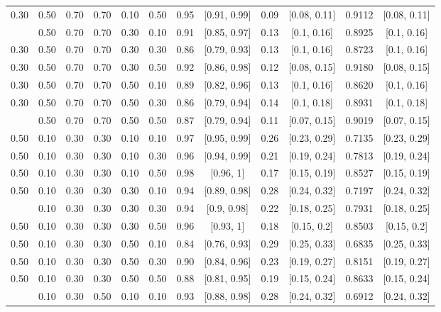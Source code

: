 \documentclass[
  11pt,
]{article}
\begin{document}
\begin{landscape}
\begin{ThreePartTable}
\begin{longtable}[t]{cccccccccccc}
0.30 & 0.50 & 0.70 & 0.70 & 0.10 & 0.50 & 0.95 & {}[0.91, 0.99] & 0.09 & {}[0.08, 0.11] & 0.9112 & {}[0.08, 0.11]\\
\addlinespace
0.30 & 0.50 & 0.70 & 0.70 & 0.30 & 0.10 & 0.91 & {}[0.85, 0.97] & 0.13 & {}[0.1, 0.16] & 0.8925 & {}[0.1, 0.16]\\
0.30 & 0.50 & 0.70 & 0.70 & 0.30 & 0.30 & 0.86 & {}[0.79, 0.93] & 0.13 & {}[0.1, 0.16] & 0.8723 & {}[0.1, 0.16]\\
0.30 & 0.50 & 0.70 & 0.70 & 0.30 & 0.50 & 0.92 & {}[0.86, 0.98] & 0.12 & {}[0.08, 0.15] & 0.9180 & {}[0.08, 0.15]\\
0.30 & 0.50 & 0.70 & 0.70 & 0.50 & 0.10 & 0.89 & {}[0.82, 0.96] & 0.13 & {}[0.1, 0.16] & 0.8620 & {}[0.1, 0.16]\\
0.30 & 0.50 & 0.70 & 0.70 & 0.50 & 0.30 & 0.86 & {}[0.79, 0.94] & 0.14 & {}[0.1, 0.18] & 0.8931 & {}[0.1, 0.18]\\
\addlinespace
0.30 & 0.50 & 0.70 & 0.70 & 0.50 & 0.50 & 0.87 & {}[0.79, 0.94] & 0.11 & {}[0.07, 0.15] & 0.9019 & {}[0.07, 0.15]\\
0.50 & 0.10 & 0.30 & 0.30 & 0.10 & 0.10 & 0.97 & {}[0.95, 0.99] & 0.26 & {}[0.23, 0.29] & 0.7135 & {}[0.23, 0.29]\\
0.50 & 0.10 & 0.30 & 0.30 & 0.10 & 0.30 & 0.96 & {}[0.94, 0.99] & 0.21 & {}[0.19, 0.24] & 0.7813 & {}[0.19, 0.24]\\
0.50 & 0.10 & 0.30 & 0.30 & 0.10 & 0.50 & 0.98 & {}[0.96, 1] & 0.17 & {}[0.15, 0.19] & 0.8527 & {}[0.15, 0.19]\\
0.50 & 0.10 & 0.30 & 0.30 & 0.30 & 0.10 & 0.94 & {}[0.89, 0.98] & 0.28 & {}[0.24, 0.32] & 0.7197 & {}[0.24, 0.32]\\
\addlinespace
0.50 & 0.10 & 0.30 & 0.30 & 0.30 & 0.30 & 0.94 & {}[0.9, 0.98] & 0.22 & {}[0.18, 0.25] & 0.7931 & {}[0.18, 0.25]\\
0.50 & 0.10 & 0.30 & 0.30 & 0.30 & 0.50 & 0.96 & {}[0.93, 1] & 0.18 & {}[0.15, 0.2] & 0.8503 & {}[0.15, 0.2]\\
0.50 & 0.10 & 0.30 & 0.30 & 0.50 & 0.10 & 0.84 & {}[0.76, 0.93] & 0.29 & {}[0.25, 0.33] & 0.6835 & {}[0.25, 0.33]\\
0.50 & 0.10 & 0.30 & 0.30 & 0.50 & 0.30 & 0.90 & {}[0.84, 0.96] & 0.23 & {}[0.19, 0.27] & 0.8151 & {}[0.19, 0.27]\\
0.50 & 0.10 & 0.30 & 0.30 & 0.50 & 0.50 & 0.88 & {}[0.81, 0.95] & 0.19 & {}[0.15, 0.24] & 0.8633 & {}[0.15, 0.24]\\
\addlinespace
0.50 & 0.10 & 0.30 & 0.50 & 0.10 & 0.10 & 0.93 & {}[0.88, 0.98] & 0.28 & {}[0.24, 0.32] & 0.6912 & {}[0.24, 0.32]\\

\end{longtable}
\end{ThreePartTable}
\end{landscape}
\end{document}
